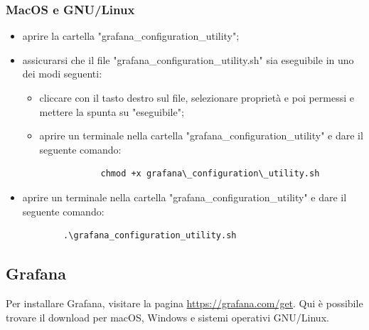 	\subsubsection{MacOS e GNU/Linux}
	\begin{itemize}
		\item aprire la cartella "grafana\_configuration\_utility";
		\item assicurarsi che il file "grafana\_configuration\_utility.sh" sia eseguibile in uno dei modi seguenti:
		\begin{itemize}
			\item cliccare con il tasto destro sul file, selezionare proprietà e poi permessi e mettere la spunta su "eseguibile";
			\item aprire un terminale nella cartella "grafana\_configuration\_utility" e dare il seguente comando: 
			\begin{verbatim}
			chmod +x grafana\_configuration\_utility.sh
			\end{verbatim}
		\end{itemize}
		\item aprire un terminale nella cartella "grafana\_configuration\_utility" e dare il seguente comando:
		\begin{verbatim}
	    .\grafana_configuration_utility.sh
		\end{verbatim}
	\end{itemize}
\subsection{Grafana}
Per installare Grafana\glo, visitare la pagina \url{https://grafana.com/get}. Qui è possibile trovare il download per macOS, Windows e sistemi operativi GNU/Linux.
